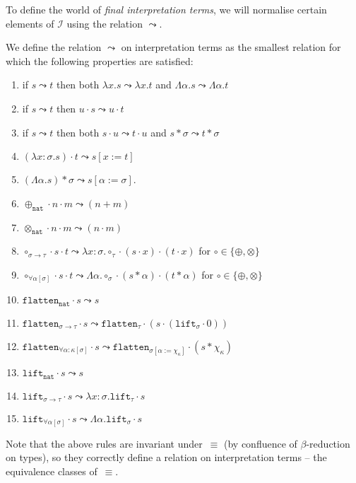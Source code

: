 \documentclass[runningheads,a4paper]{llncs}
\newcommand{\Iterms}{\mathcal{I}}
\newcommand{\quant}[2]{\forall #1[#2]}
\newcommand{\arrtype}{\rightarrow}
\newcommand{\abs}[2]{\lambda #1.#2}
\newcommand{\tabs}[2]{\Lambda #1.#2}
\newcommand{\app}[2]{#1 \cdot #2}
\newcommand{\tapp}[2]{#1 * #2}
\newcommand{\subst}[2]{#1:=#2}
\newcommand{\nat}{\mathtt{nat}}
\newcommand{\flatten}{\mathtt{flatten}}
\newcommand{\lift}{\mathtt{lift}}
\begin{document}
To define the world of \emph{final interpretation terms}, we will
normalise certain elements of $\Iterms$ using the relation $\leadsto$.

\begin{definition}
  We define the relation $\leadsto$ on interpretation terms as the
  smallest relation for which the following properties are satisfied:
  \begin{enumerate}
  \item\label{leadsto:mono:abs}
    if $s \leadsto t$ then both $\abs{x}{s} \leadsto \abs{x}{t}$ and
    $\tabs{\alpha}{s} \leadsto \tabs{\alpha}{t}$
  \item\label{leadsto:mono:right}
    if $s \leadsto t$ then $\app{u}{s} \leadsto \app{u}{t}$
  \item\label{leadsto:mono:left}
    if $s \leadsto t$ then both $\app{s}{u} \leadsto \app{t}{u}$ and
    $\tapp{s}{\sigma} \leadsto \tapp{t}{\sigma}$
  \item\label{leadsto:beta:abs} $\app{(\abs{x:\sigma}{s})}{t} \leadsto
    s[\subst{x}{t}]$
  \item\label{leadsto:beta:tabs} $\tapp{(\tabs{\alpha}{s})}{\sigma}
    \leadsto s[\subst{\alpha}{\sigma}]$.
  \item\label{leadsto:plus:base}
    $\app{\app{\oplus_{\nat}}{n}}{m} \leadsto (n+m)$
  \item\label{leadsto:times:base} $\app{\app{\otimes_{\nat}}{n}}{m}
    \leadsto (n \cdot m)$
  \item\label{leadsto:circ:arrow} $\app{\app{\circ_{\sigma \arrtype
        \tau}}{s}}{t} \leadsto
    \abs{x:\sigma}{\app{\app{\circ_\tau}{(\app{s}{x})}}{(\app{t}{x})}}$
    for $\circ \in \{ \oplus, \otimes \}$
  \item\label{leadsto:circ:forall}
    $\app{\app{\circ_{\quant{\alpha}{\sigma}}}{s}}{t} \leadsto
    \tabs{\alpha}{\app{\app{\circ_\sigma}{(\tapp{s}{\alpha})}}{(
        \tapp{t}{\alpha})}}$ for $\circ \in \{ \oplus, \otimes \}$
  \item $\app{\flatten_\nat}{s} \leadsto s$
  \item $\app{\flatten_{\sigma \arrtype \tau}}{s} \leadsto
    \app{\flatten_\tau}{(\app{s}{(\app{\lift_\sigma}{0})})}$
  \item $\app{\flatten_{\quant{\alpha:\kappa}{\sigma}}}{s} \leadsto
    \app{\flatten_{\sigma[\subst{\alpha}{\chi_\kappa}]}}{(\tapp{s}{\chi_\kappa})}$
  \item $\app{\lift_\nat}{s} \leadsto s$
  \item $\app{\lift_{\sigma \arrtype \tau}}{s} \leadsto
    \abs{x:\sigma}{\app{\lift_{\tau}}{s}}$
  \item $\app{\lift_{\quant{\alpha}{\sigma}}}{s} \leadsto
    \tabs{\alpha}{\app{\lift_{\sigma}}{s}}$
  \end{enumerate}
  Note that the above rules are invariant under~$\equiv$ (by
  confluence of $\beta$-reduction on types), so they correctly define
  a relation on interpretation terms -- the equivalence classes
  of~$\equiv$.


\end{definition}
\end{document}
